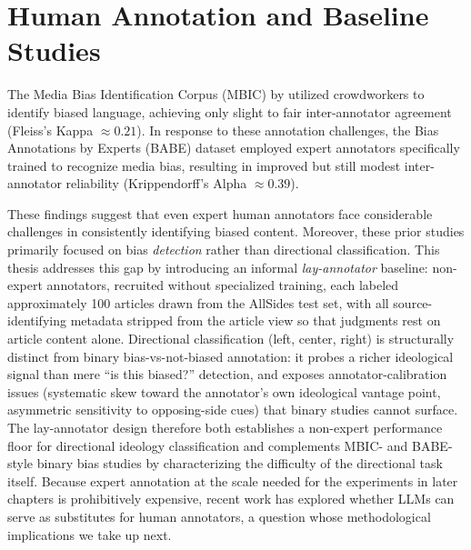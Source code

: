 \section{Human Annotation and Baseline Studies}
\label{sec:rw-human-annotation}

The Media Bias Identification Corpus (MBIC) by \citet{spinde2021mbic} utilized crowdworkers to identify biased language, achieving only slight to fair inter-annotator agreement (Fleiss's Kappa $\approx 0.21$). In response to these annotation challenges, the Bias Annotations by Experts (BABE) dataset \citep{spinde2021babe} employed expert annotators specifically trained to recognize media bias, resulting in improved but still modest inter-annotator reliability (Krippendorff's Alpha $\approx 0.39$).

These findings suggest that even expert human annotators face considerable challenges in consistently identifying biased content. Moreover, these prior studies primarily focused on bias \textit{detection} rather than directional classification. This thesis addresses this gap by introducing an informal \emph{lay-annotator} baseline: non-expert annotators, recruited without specialized training, each labeled approximately 100 articles drawn from the AllSides test set, with all source-identifying metadata stripped from the article view so that judgments rest on article content alone. Directional classification (left, center, right) is structurally distinct from binary bias-vs-not-biased annotation: it probes a richer ideological signal than mere ``is this biased?'' detection, and exposes annotator-calibration issues (systematic skew toward the annotator's own ideological vantage point, asymmetric sensitivity to opposing-side cues) that binary studies cannot surface. The lay-annotator design therefore both establishes a non-expert performance floor for directional ideology classification and complements MBIC- and BABE-style binary bias studies by characterizing the difficulty of the directional task itself. Because expert annotation at the scale needed for the experiments in later chapters is prohibitively expensive, recent work has explored whether LLMs can serve as substitutes for human annotators, a question whose methodological implications we take up next.

